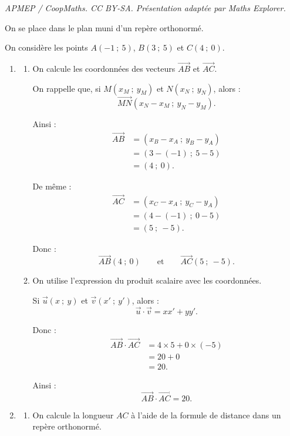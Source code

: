 \documentclass[10pt]{article}
\begin{document}
\noindent\textit{APMEP / CoopMaths. CC BY-SA. Présentation adaptée par Maths Explorer.}\par\medskip
On se place dans le plan muni d'un repère orthonormé.

On considère les points $A(-1\ ;\ 5)$, $B(3\ ;\ 5)$ et $C(4\ ;\ 0)$.

\begin{enumerate}
\item \begin{enumerate}
\item On calcule les coordonnées des vecteurs $\overrightarrow{AB}$ et $\overrightarrow{AC}$.

On rappelle que, si $M(x_M\ ;\ y_M)$ et $N(x_N\ ;\ y_N)$, alors :
\[
\overrightarrow{MN}(x_N-x_M\ ;\ y_N-y_M).
\]

Ainsi :
\begin{align*}
\overrightarrow{AB}
&=(x_B-x_A\ ;\ y_B-y_A)\\
&=(3-(-1)\ ;\ 5-5)\\
&=(4\ ;\ 0).
\end{align*}

De même :
\begin{align*}
\overrightarrow{AC}
&=(x_C-x_A\ ;\ y_C-y_A)\\
&=(4-(-1)\ ;\ 0-5)\\
&=(5\ ;\ -5).
\end{align*}

Donc :
\[
\overrightarrow{AB}(4\ ;\ 0)
\qquad \text{et} \qquad
\overrightarrow{AC}(5\ ;\ -5).
\]

\item On utilise l'expression du produit scalaire avec les coordonnées.

Si $\vec u(x\ ;\ y)$ et $\vec v(x'\ ;\ y')$, alors :
\[
\vec u\cdot \vec v=xx'+yy'.
\]

Donc :
\begin{align*}
\overrightarrow{AB}\cdot\overrightarrow{AC}
&=4\times 5+0\times (-5)\\
&=20+0\\
&=20.
\end{align*}

Ainsi :
\[
\overrightarrow{AB}\cdot\overrightarrow{AC}=20.
\]
\end{enumerate}

\item \begin{enumerate}
\item On calcule la longueur $AC$ à l'aide de la formule de distance dans un repère orthonormé.


\end{enumerate}
\end{enumerate}
\end{document}
